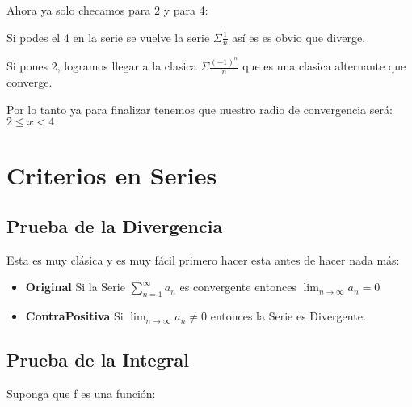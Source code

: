 \documentclass[12pt]{report}                                %
\begin{document}
            Ahora ya solo checamos para 2 y para 4:

            Si podes el 4 en la serie se vuelve la serie $\Sigma \frac{1}{n}$ así es es obvio que diverge.

            Si pones 2, logramos llegar a la clasica $\Sigma \frac{(-1)^n}{n}$ que es una clasica
            alternante que converge.

            Por lo tanto ya para finalizar tenemos que nuestro radio de convergencia será:
            $2 \leq x < 4$








\clearpage
\chapter{Criterios en Series}

    \clearpage
    \section{Prueba de la Divergencia}
        Esta es muy clásica y es muy fácil primero hacer esta antes
        de hacer nada más:

        \begin{itemize}
            \item \textbf{Original} Si la Serie $\sum_{n=1}^{\infty} a_n$ es
            convergente entonces $\lim_{n \to \infty} a_n = 0$

            \item \textbf{ContraPositiva} Si $\lim_{n \to \infty} a_n \neq 0$ entonces la Serie es Divergente.
        \end{itemize}

    \clearpage
    \section{Prueba de la Integral}
        Suponga que f es una función:
\end{document}
